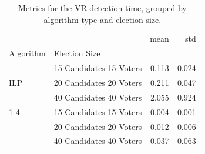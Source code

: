 \begin{table}[t!]
    \centering
    \begin{tabular}{llrr}
        \toprule
            &                         &  mean &   std \\
        Algorithm & Election Size &       &       \\
        \midrule
        \multirow{3}{*}{ILP} & 15 Candidates 15 Voters & 0.113 & 0.024 \\
            & 20 Candidates 20 Voters & 0.211 & 0.047 \\
            & 40 Candidates 40 Voters & 2.055 & 0.924 \\
        \cline{1-4}
        \multirow{3}{*}{SAT} & 15 Candidates 15 Voters & 0.004 & 0.001 \\
            & 20 Candidates 20 Voters & 0.012 & 0.006 \\
            & 40 Candidates 40 Voters & 0.037 & 0.063 \\
        \bottomrule
    \end{tabular}
    \caption{Metrics for the VR detection time, grouped by algorithm type and election size.}
    \label{tab:ch3:ex}
\end{table}
